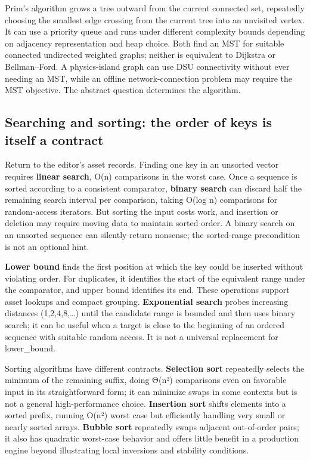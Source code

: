 Prim's algorithm grows a tree outward from the current connected set, repeatedly choosing the smallest edge crossing from the current tree into an unvisited vertex. It can use a priority queue and runs under different complexity bounds depending on adjacency representation and heap choice. Both find an MST for suitable connected undirected weighted graphs; neither is equivalent to Dijkstra or Bellman--Ford. A physics-island graph can use DSU connectivity without ever needing an MST, while an offline network-connection problem may require the MST objective. The abstract question determines the algorithm.

\subsection{Searching and sorting: the order of keys is itself a contract}\label{05-engine-i-ch008-searching-and-sorting-the-order-of-keys-is-itself-a-contract}

\hypertarget{05-engine-i-ch008-searching-and-sorting-the-order-of-keys-is-itself-a-contract}{}

Return to the editor's asset records. Finding one key in an unsorted vector requires \textbf{linear search}, O(n) comparisons in the worst case. Once a sequence is sorted according to a consistent comparator, \textbf{binary search} can discard half the remaining search interval per comparison, taking O(log n) comparisons for random-access iterators. But sorting the input costs work, and insertion or deletion may require moving data to maintain sorted order. A binary search on an unsorted sequence can silently return nonsense; the sorted-range precondition is not an optional hint.

\textbf{Lower bound} finds the first position at which the key could be inserted without violating order. For duplicates, it identifies the start of the equivalent range under the comparator, and upper bound identifies its end. These operations support asset lookups and compact grouping. \textbf{Exponential search} probes increasing distances (1,2,4,8,\ldots) until the candidate range is bounded and then uses binary search; it can be useful when a target is close to the beginning of an ordered sequence with suitable random access. It is not a universal replacement for lower\_bound.

Sorting algorithms have different contracts. \textbf{Selection sort} repeatedly selects the minimum of the remaining suffix, doing Θ(n²) comparisons even on favorable input in its straightforward form; it can minimize swaps in some contexts but is not a general high-performance choice. \textbf{Insertion sort} shifts elements into a sorted prefix, running O(n²) worst case but efficiently handling very small or nearly sorted arrays. \textbf{Bubble sort} repeatedly swaps adjacent out-of-order pairs; it also has quadratic worst-case behavior and offers little benefit in a production engine beyond illustrating local inversions and stability conditions.

